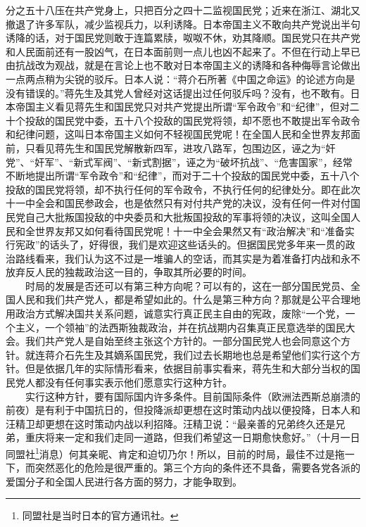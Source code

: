 \documentclass[cn,11pt,chinese]{elegantbook}
\begin{document}
分之五十八压在共产党身上，只把百分之四十二监视国民党；近来在浙江、湖北又撤退了许多军队，减少监视兵力，以利诱降。日本帝国主义不敢向共产党说出半句诱降的话，对于国民党则敢于连篇累牍，呶呶不休，劝其降顺。国民党只在共产党和人民面前还有一股凶气，在日本面前则一点儿也凶不起来了。不但在行动上早已由抗战改为观战，就是在言论上也不敢对日本帝国主义的诱降和各种侮辱言论做出一点两点稍为尖锐的驳斥。日本人说：“蒋介石所著《中国之命运》的论述方向是没有错误的。”蒋先生及其党人曾经对这话提出过任何驳斥吗？没有，也不敢有。日本帝国主义看见蒋先生和国民党只对共产党提出所谓“军令政令”和“纪律”，但对二十个投敌的国民党中委，五十八个投敌的国民党将领，却不愿也不敢提出军令政令和纪律问题，这叫日本帝国主义如何不轻视国民党呢！在全国人民和全世界友邦面前，只看见蒋先生和国民党解散新四军，进攻八路军，包围边区，诬之为“奸党”、“奸军”、“新式军阀”、“新式割据”，诬之为“破坏抗战”、“危害国家”，经常不断地提出所谓“军令政令”和“纪律”，而对于二十个投敌的国民党中委，五十八个投敌的国民党将领，却不执行任何的军令政令，不执行任何的纪律处分。即在此次十一中全会和国民参政会，也是依然只有对付共产党的决议，没有任何一件对付国民党自己大批叛国投敌的中央委员和大批叛国投敌的军事将领的决议，这叫全国人民和全世界友邦又如何看待国民党呢！十一中全会果然又有“政治解决”和“准备实行宪政”的话头了，好得很，我们是欢迎这些话头的。但据国民党多年来一贯的政治路线看来，我们认为这不过是一堆骗人的空话，而其实是为着准备打内战和永不放弃反人民的独裁政治这一目的，争取其所必要的时间。\\
　　时局的发展是否还可以有第三种方向呢？可以有的，这在一部分国民党员、全国人民和我们共产党人，都是希望如此的。什么是第三种方向？那就是公平合理地用政治方式解决国共关系问题，诚意实行真正民主自由的宪政，废除“一个党，一个主义，一个领袖”的法西斯独裁政治，并在抗战期内召集真正民意选举的国民大会。我们共产党人是自始至终主张这个方针的。一部分国民党人也会同意这个方针。就连蒋介石先生及其嫡系国民党，我们过去长期地也总是希望他们实行这个方针。但是依据几年的实际情形看来，依据目前事实看来，蒋先生和大部分当权的国民党人都没有任何事实表示他们愿意实行这种方针。\\
　　实行这种方针，要有国际国内许多条件。目前国际条件（欧洲法西斯总崩溃的前夜）是有利于中国抗日的，但投降派却更想在这时策动内战以便投降，日本人和汪精卫却更想在这时策动内战以利招降。汪精卫说：“最亲善的兄弟终久还是兄弟，重庆将来一定和我们走同一道路，但我们希望这一日期愈快愈好。”（十月一日同盟社\footnote[6]{ 同盟社是当时日本的官方通讯社。}消息）何其亲昵、肯定和迫切乃尔！所以，目前的时局，最佳不过是拖一下，而突然恶化的危险是很严重的。第三个方向的条件还不具备，需要各党各派的爱国分子和全国人民进行各方面的努力，才能争取到。\\
\end{document}
